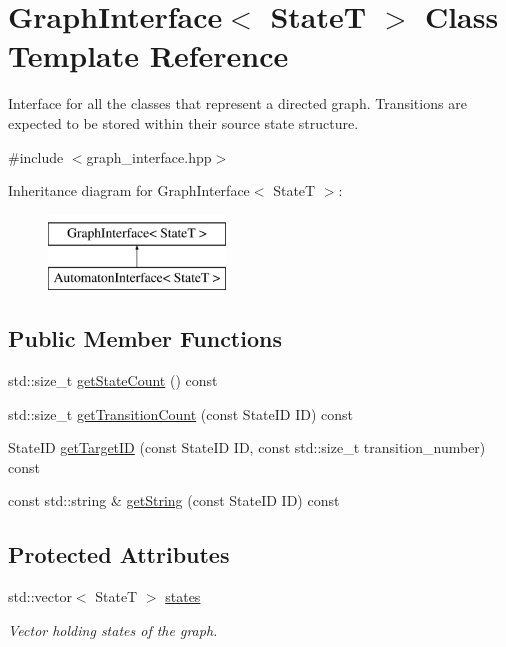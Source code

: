 \hypertarget{classGraphInterface}{\section{\-Graph\-Interface$<$ \-State\-T $>$ \-Class \-Template \-Reference}
\label{classGraphInterface}
}


\-Interface for all the classes that represent a directed graph. \-Transitions are expected to be stored within their source state structure.  




{\ttfamily \#include $<$graph\-\_\-interface.\-hpp$>$}

\-Inheritance diagram for \-Graph\-Interface$<$ \-State\-T $>$\-:\begin{figure}[H]
\begin{center}
\leavevmode
\includegraphics[height=2.000000cm]{classGraphInterface}
\end{center}
\end{figure}
\subsection*{\-Public \-Member \-Functions}
\begin{DoxyCompactItemize}
\item 
std\-::size\-\_\-t \hyperlink{classGraphInterface_a826adfb63a3a03795b0b15c4cff2a414}{get\-State\-Count} () const 
\item 
std\-::size\-\_\-t \hyperlink{classGraphInterface_af91873935ea90cce19f9db607f905071}{get\-Transition\-Count} (const \-State\-I\-D \-I\-D) const 
\item 
\-State\-I\-D \hyperlink{classGraphInterface_ac0479fb67be175a92af216a6901d721d}{get\-Target\-I\-D} (const \-State\-I\-D \-I\-D, const std\-::size\-\_\-t transition\-\_\-number) const 
\item 
const std\-::string \& \hyperlink{classGraphInterface_af05eafbb06b45872478168868d6747d9}{get\-String} (const \-State\-I\-D \-I\-D) const 
\end{DoxyCompactItemize}
\subsection*{\-Protected \-Attributes}
\begin{DoxyCompactItemize}
\item 
\hypertarget{classGraphInterface_af177873052deecf8de9f3eb3daa3b7e3}{std\-::vector$<$ \-State\-T $>$ \hyperlink{classGraphInterface_af177873052deecf8de9f3eb3daa3b7e3}{states}}\label{classGraphInterface_af177873052deecf8de9f3eb3daa3b7e3}

\begin{DoxyCompactList}\small\item\em \-Vector holding states of the graph. \end{DoxyCompactList}\end{DoxyCompactItemize}
